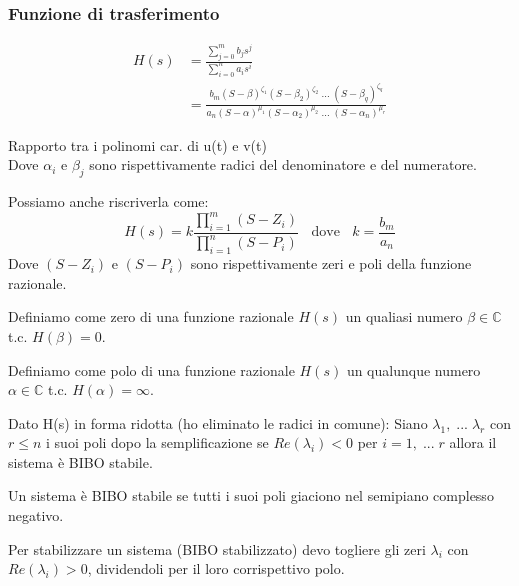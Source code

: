 \documentclass[a4paper]{article}
\begin{document}
\subsubsection{Funzione di trasferimento}
    \begin{align*}
        H(s) &= \frac{\sum_{j=0}^{m}b_js^j}{\sum_{i=0}^{n}a_is^i}\\
        &= \frac{b_m(S-\beta)^{\zeta_1}(S-\beta_2)^{\zeta_2}\; ... \; (S-\beta_q)^{\zeta_q}}{a_n(S-\alpha)^{\mu_1}(S-\alpha_2)^{\mu_2}\; ... \; (S-\alpha_n)^{\mu_r}}
    \end{align*}
    \begin{center}
    \colorbox{blue!30!white}{Rapporto tra i polinomi car. di u(t) e v(t)}\\
    Dove $\alpha_i$ e $\beta_j$ sono rispettivamente radici del denominatore e del numeratore.
    \end{center}
    Possiamo anche riscriverla come:
    \[H(s) = k\frac{\prod_{i = 1}^m (S - Z_i)}{\prod_{i = 1}^n (S - P_i)} \; \;  \text{ dove } \; \; k = \frac{b_m}{a_n}\]
    Dove $(S - Z_i)$ e $(S - P_i)$ sono rispettivamente zeri e poli della funzione razionale. 
    

    \begin{definition}
        Definiamo come zero di una funzione razionale $H(s)$ un qualiasi numero $\beta \in \mathbb{C}$ t.c. $H(\beta) = 0$.
    \end{definition}
    \begin{definition}
        Definiamo come polo di una funzione razionale $H(s)$ un qualunque numero $\alpha \in \mathbb{C}$ t.c. $H(\alpha) = \infty$.
    \end{definition}
    \noindent
    Dato H(s) in forma ridotta (ho eliminato le radici in comune): Siano $\lambda_1, \; ... \; \lambda_r$ con $r \le n$ i suoi poli dopo la semplificazione
    se $Re(\lambda_i) < 0$ per $i = 1, \; ... \; r$ allora il sistema è BIBO stabile. 
    \begin{lemma}
        \label{lemma:polo_bibo_stabile}
        Un sistema è BIBO stabile se tutti i suoi poli giaciono nel semipiano complesso negativo.
    \end{lemma}
    \noindent
    Per stabilizzare un sistema (BIBO stabilizzato) devo togliere gli zeri $\lambda_i$ con $Re(\lambda_i) > 0$, dividendoli per il loro corrispettivo polo.
\end{document}
